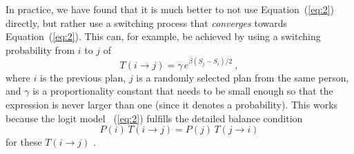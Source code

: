 In practice, we have found that it is much better to not use
Equation~(\ref{eq:2}) directly, but rather use a switching process that
\emph{converges} towards Equation~(\ref{eq:2}).  
This can, for example, be
achieved by using a switching probability from $i$ to $j$ of
\begin{equation}
T(i \to j) = \gamma \,  e^{\beta ( S_j - S_i )/2} \ ,
\label{eq:3}
\end{equation}
where $i$ is the previous plan, $j$ is a randomly selected plan from
the same person, and $\gamma$ is a proportionality constant that needs
to be small enough so that the expression is never larger than one
(since it denotes a probability).  This works because the logit model~
(\ref{eq:2})
fulfills the detailed balance condition
\begin{equation}
P(i) \, T(i \to j) = P(j) \, T(j \to i) 
\label{eq:detailed-balance}
\end{equation}
for these $T(i \to j)$ \citep[e.g.,][]{ross-2006}.%
